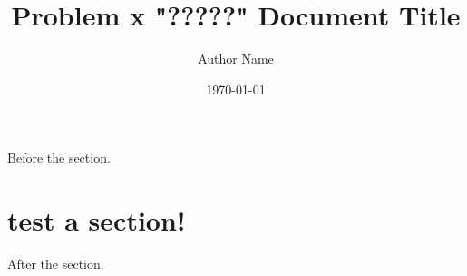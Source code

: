 \documentclass[nofonts]{tufte-handout}
\title{Problem x "?????" Document Title}
\author{Author Name}
\date{\today}
\newcommand{\textls}[2][5]{%
    \begingroup\addfontfeatures{LetterSpace=#1}#2\endgroup
  }
\renewcommand{\smallcapsspacing}[1]{\textls[10]{#1}}
\renewcommand{\allcaps}[1]{\textls[15]{\MakeTextUppercase{#1}}}
\renewcommand{\smallcaps}[1]{\smallcapsspacing{\scshape\MakeTextLowercase{#1}}}
\renewcommand{\textsc}[1]{\smallcapsspacing{\textsmallcaps{#1}}}
\begin{document}
\maketitle


Before the section. 

\section{test a section!}

After the section.

\lipsum[1-10]
\end{document}
